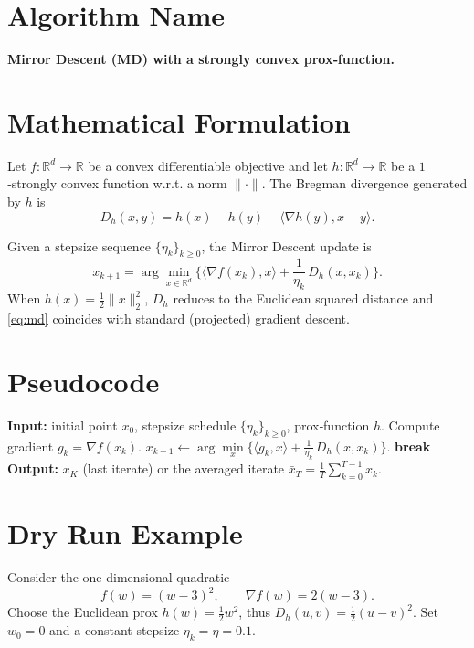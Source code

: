 \documentclass{article}
\newcommand{\Breg}{D_{h}}
\newcommand{\inner}[2]{\langle #1,#2\rangle}
\begin{document}
\section*{Algorithm Name}
\textbf{Mirror Descent (MD) with a strongly convex prox‑function.}

\section*{Mathematical Formulation}
Let $f:\mathbb{R}^{d}\to\mathbb{R}$ be a convex differentiable objective and let
$h:\mathbb{R}^{d}\to\mathbb{R}$ be a $1$‑strongly convex function w.r.t. a norm $\|\cdot\|$.
The Bregman divergence generated by $h$ is
\[
\Breg(x,y)=h(x)-h(y)-\inner{\nabla h(y)}{x-y}.
\]

Given a stepsize sequence $\{\eta_k\}_{k\ge 0}$, the Mirror Descent update is
\begin{equation}
\label{eq:md}
x_{k+1}= \arg\min_{x\in\mathbb{R}^{d}}
\Big\{ \inner{\nabla f(x_k)}{x}+ \frac{1}{\eta_k}\,\Breg(x,x_k) \Big\}.
\end{equation}
When $h(x)=\tfrac12\|x\|_2^2$, $\Breg$ reduces to the Euclidean squared distance and \eqref{eq:md}
coincides with standard (projected) gradient descent.

\section*{Pseudocode}
\begin{algorithm}[H]
\caption{Mirror Descent}
\begin{algorithmic}[1]
\STATE \textbf{Input:} initial point $x_0$, stepsize schedule $\{\eta_k\}_{k\ge0}$, prox‑function $h$.
    \STATE Compute gradient $g_k=\nabla f(x_k)$.
    \STATE $x_{k+1}\gets \arg\min\limits_{x}\Big\{ \inner{g_k}{x}+ \frac{1}{\eta_k}\,\Breg(x,x_k) \Big\}$.
        \STATE \textbf{break}
    \ENDIF
\ENDFOR
\STATE \textbf{Output:} $x_{K}$ (last iterate) or the averaged iterate $\bar x_T=\frac1T\sum_{k=0}^{T-1}x_k$.
\end{algorithmic}
\end{algorithm}

\section*{Dry Run Example}
Consider the one‑dimensional quadratic
\[
f(w)=(w-3)^2,\qquad \nabla f(w)=2(w-3).
\]
Choose the Euclidean prox $h(w)=\tfrac12 w^{2}$, thus $\Breg(u,v)=\tfrac12 (u-v)^2$.
Set $w_0=0$ and a constant stepsize $\eta_k=\eta=0.1$.
\end{document}
